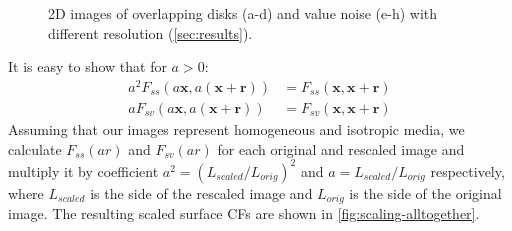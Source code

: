 \documentclass[reprint,amsmath,amssymb,aps,pre,showkeys,showpacs]{revtex4-1}
\begin{document}
\begin{figure}[t]
{    \label{fig:noise-4096}}
  \hfill
  \hfill
  \hfill
  \caption[]{2D images of overlapping disks (a-d) and value noise (e-h) with
    different resolution (\cref{sec:results}).}
  \label{fig:disks-noise}
\end{figure}

It is easy to show that for $a > 0$:
\begin{align}
  a^2 F_{ss}(a \mathbf{x}, a(\mathbf{x} + \mathbf{r})) &= F_{ss}(\mathbf{x},
  \mathbf{x} + \mathbf{r}) \label{eq:scale-ss} \\
  a F_{sv}(a \mathbf{x}, a(\mathbf{x} + \mathbf{r})) &= F_{sv}(\mathbf{x},
  \mathbf{x} + \mathbf{r}) \label{eq:scale-sv}
\end{align}
Assuming that our images represent homogeneous and isotropic media, we calculate
$F_{ss}(ar)$ and $F_{sv}(ar)$ for each original and rescaled image and multiply
it by coefficient $a^2 = (L_{scaled}/L_{orig})^2$ and $a = L_{scaled}/L_{orig}$
respectively, where $L_{scaled}$ is the side of the rescaled image and
$L_{orig}$ is the side of the original image. The resulting scaled surface CFs
are shown in \cref{fig:scaling-alltogether}.
\end{document}
